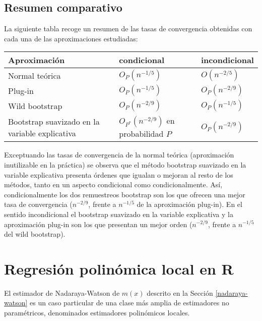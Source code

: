 \documentclass[
]{book}
\theoremstyle{break}
\theoremstyle{definition}
\theoremstyle{definition}
\theoremstyle{definition}
\theoremstyle{definition}
\theoremstyle{remark}
\begin{document}
\hypertarget{resumen-comparativo}{%
\subsection{Resumen comparativo}\label{resumen-comparativo}}

La siguiente tabla recoge un resumen de las tasas de convergencia
obtenidas con cada una de las aproximaciones estudiadas:

\begin{longtable}[]{@{}
  >{\raggedright\arraybackslash}p{}
  >{\raggedright\arraybackslash}p{}
  >{\raggedright\arraybackslash}p{}@{}}
\toprule
Aproximación & condicional & incondicional \\
\midrule
\endhead
Normal teórica & \(O_{P}\left( n^{-1/5}\right)\) & \(O\left(n^{-2/5}\right)\) \\
Plug-in & \(O_{P}\left( n^{-1/5}\right)\) & \(O_{P}\left( n^{-2/9}\right)\) \\
Wild bootstrap & \(O_{P}\left( n^{-2/9}\right)\) & \(O_{P}\left(n^{-1/5}\right)\) \\
Bootstrap suavizado
en la variable
explicativa & \(O_{P^{\ast}}\left( n^{-2/9}\right)\)
en probabilidad \(P\) & \(O_{P}\left(n^{-2/9}\right)\) \\
\bottomrule
\end{longtable}

Exceptuando las tasas de convergencia de la normal teórica (aproximación
inutilizable en la práctica) se observa que el método bootstrap
suavizado en la variable explicativa presenta órdenes que igualan o
mejoran al resto de los métodos, tanto en un aspecto condicional como
condicionalmente. Así, condicionalmente los dos remuestreos bootstrap
son los que ofrecen una mejor tasa de convergencia (\(n^{-2/9}\),
frente a \(n^{-1/5}\) de la aproximación plug-in). En el
sentido incondicional el bootstrap suavizado en la variable explicativa
y la aproximación plug-in son los que presentan un mejor orden
(\(n^{-2/9}\), frente a \(n^{-1/5}\) del wild bootstrap).

\hypertarget{locpol-r}{%
\section{Regresión polinómica local en R}\label{locpol-r}}

El estimador de Nadaraya-Watson de \(m(x)\) descrito en la Sección \ref{nadaraya-watson}
es un caso particular de una clase más amplia de estimadores no paramétricos,
denominados estimadores polinómicos locales.
\end{document}
